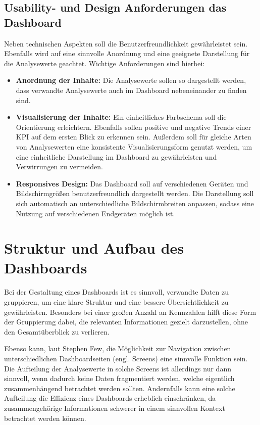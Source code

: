 \subsection{Usability- und Design Anforderungen das Dashboard}
\label{sssec:usability}
Neben technischen Aspekten soll die Benutzerfreundlichkeit gewährleistet sein. Ebenfalls wird auf eine sinnvolle Anordnung und eine geeignete Darstellung für die Analysewerte geachtet. Wichtige Anforderungen sind hierbei:
\begin{itemize}
    \item \textbf{Anordnung der Inhalte:} Die Analysewerte sollen so dargestellt werden, dass verwandte Analysewerte auch im Dashboard nebeneinander zu finden sind.
    \item \textbf{Visualisierung der Inhalte:} Ein einheitliches Farbschema soll die Orientierung erleichtern. Ebenfalls sollen positive und negative Trends einer KPI auf dem ersten Blick zu erkennen sein. Außerdem soll für gleiche Arten von Analysewerten eine konsistente Visualisierungsform genutzt werden, um eine einheitliche Darstellung im Dashboard zu gewährleisten und Verwirrungen zu vermeiden.
    \item \textbf{Responsives Design:} Das Dashboard soll auf verschiedenen Geräten und Bildschirmgrößen benutzerfreundlich dargestellt werden. Die Darstellung soll sich automatisch an unterschiedliche Bildschirmbreiten anpassen, sodass eine Nutzung auf verschiedenen Endgeräten möglich ist.
\end{itemize}

\section{Struktur und Aufbau des Dashboards}
Bei der Gestaltung eines Dashboards ist es sinnvoll, verwandte Daten zu gruppieren, um eine klare Struktur und eine bessere Übersichtlichkeit zu gewährleisten. Besonders bei einer großen Anzahl an Kennzahlen hilft diese Form der Gruppierung dabei, die relevanten Informationen gezielt darzustellen, ohne den Gesamtüberblick zu verlieren. \parencite[Kap.14.3]{Hassler2019}

Ebenso kann, laut Stephen Few, die Möglichkeit zur Navigation zwischen unterschiedlichen Dashboardseiten (engl. Screens) eine sinnvolle Funktion sein. Die Aufteilung der Analysewerte in solche Screens ist allerdings nur dann sinnvoll, wenn dadurch keine Daten fragmentiert werden, welche eigentlich zusammenhängend betrachtet werden sollten. Andernfalls kann eine solche Aufteilung die Effizienz eines Dashboards erheblich einschränken, da zusammengehörige Informationen schwerer in einem sinnvollen Kontext betrachtet werden können. \parencite[Kap.3.1.1]{Few2006}

